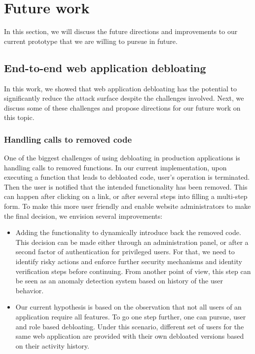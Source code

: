\section{Future work}
In this section, we will discuss the future directions and improvements to our current prototype that we are willing to pursue in future.

\subsection{End-to-end web application debloating}
In this work, we showed that web application debloating has the potential to significantly reduce the attack surface despite the challenges involved. Next, we discuss some of these challenges and propose directions for our future work on this topic.

\subsubsection{Handling calls to removed code}
One of the biggest challenges of using debloating in production applications is handling calls to removed functions. In our current implementation, upon executing a function that leads to debloated code, user's operation is terminated. Then the user is notified that the intended functionality has been removed. This can happen after clicking on a link, or after several steps into filling a multi-step form. To make this more user friendly and enable website administrators to make the final decision, we envision several improvements:
\begin{itemize}
  \item Adding the functionality to dynamically introduce back the removed code. This decision can be made either through an administration panel, or after a second factor of authentication for privileged users. For that, we need to identify risky actions and
  enforce further security mechanisms and identity verification steps before continuing. From another point of view, this step can be seen as an anomaly detection system based on history of the user behavior.
  \item Our current hypothesis is based on the observation that not all users of an application require all features. To go one step further, one can pursue, user and role based debloating. Under this scenario, different set of users for the same web application are provided with their own debloated versions based on their activity history.
\end{itemize}


